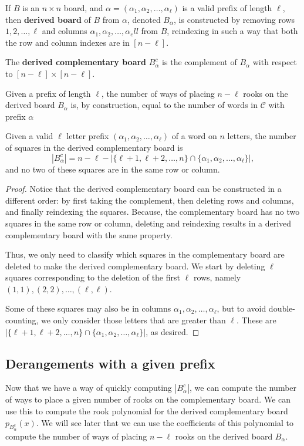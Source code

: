 \begin{definition}
  If $B$ is an $n \times n$ board, and
  $\alpha = (\alpha_1, \alpha_2, \dots, \alpha_\ell)$ is a valid prefix of length
  $\ell$, then \textbf{derived board} of $B$ from $\alpha$,
  denoted $B_\alpha$,
  is constructed by removing
  rows $1, 2, \dots, \ell$ and
  columns $\alpha_1, \alpha_2, \dots, \alpha_ell$ from $B$,
  reindexing in such a way that both the row and column indexes are in
  $[n - \ell]$.

  The \textbf{derived complementary board} $B_\alpha^c$ is the complement of
  $B_\alpha$ with respect to $[n - \ell] \times [n - \ell]$.
\end{definition}

Given a prefix of length $\ell$, the number of ways of placing $n - \ell$ rooks
on the derived board $B_\alpha$ is, by construction,
equal to the number of words in $\mathcal{C}$ with prefix $\alpha$
\begin{lemma}
  Given a valid $\ell$ letter prefix $(\alpha_1, \alpha_2, \dots, \alpha_\ell)$
  of a word on $n$ letters,
  the number of squares in the derived complementary board is \[
    |B_\alpha^c| = n - \ell - |\{\ell+1, \ell+2, \dots, n\} \cap \{\alpha_1, \alpha_2, \dots, \alpha_\ell\}|,
  \] and no two of these squares are in the same row or column.
  \label{lemma:derangementComplementSize}
\end{lemma}
\begin{proof}
  Notice that the derived complementary board can be constructed in a different
  order: by first taking the complement, then deleting rows and columns, and
  finally reindexing the squares.
  Because, the complementary board has no two squares in the same row or column,
  deleting and reindexing results in a derived complementary board with the same
  property.

  Thus, we only need to classify which squares in the complementary board are
  deleted to make the derived complementary board.
  We start by deleting $\ell$ squares corresponding to the deletion of the first
  $\ell$ rows, namely $(1, 1), (2, 2), \dots, (\ell, \ell)$.

  Some of these squares may also be in columns
  $\alpha_1, \alpha_2, \dots, \alpha_\ell$, but to avoid double-counting, we
  only consider those letters that are greater than $\ell$. These are
  $|\{\ell+1, \ell+2, \dots, n\} \cap \{\alpha_1, \alpha_2, \dots, \alpha_\ell\}|$,
  as desired.
\end{proof}

\subsection{Derangements with a given prefix}
Now that we have a way of quickly computing $|B_\alpha^c|$, we can compute the
number of ways to place a given number of rooks on the complementary board.
We can use this
to compute the rook polynomial for the derived complementary board
$p_{B_\alpha^c}(x)$.
We will see later that we can use the coefficients of this polynomial to compute
the number of ways of placing $n - \ell$ rooks on the derived board $B_\alpha$.

